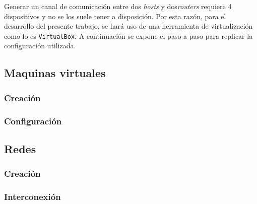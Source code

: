 Generar un canal de comunicación entre dos \emph{hosts} y dos\emph{routers} requiere 4 dispositivos y no se los suele tener a disposición. Por esta razón, para el desarrollo del presente trabajo, se hará uso de una herramienta de virtualización como lo es \texttt{VirtualBox}. A continuación se expone el paso a paso para replicar la configuración utilizada.

\subsection{Maquinas virtuales}

	\subsubsection{Creación}

	\subsubsection{Configuración}

\subsection{Redes}

	\subsubsection{Creación}

	\subsubsection{Interconexión}
